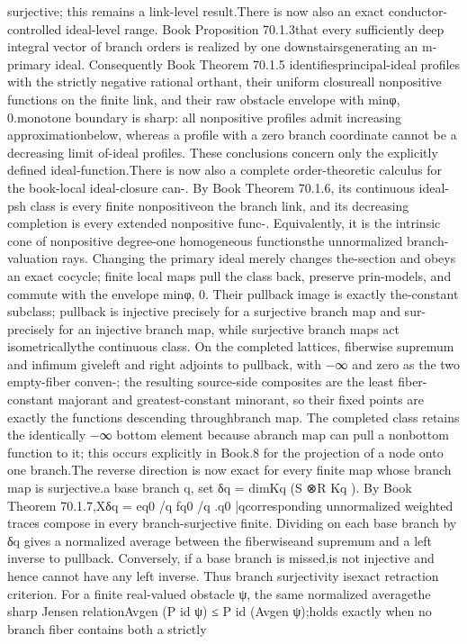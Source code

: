 \documentclass[11pt]{article}
\begin{document}
\begin{GrantData}
{surjective; this remains a link-level result.\n    There is now also an exact conductor-controlled ideal-level range. Book Proposition 70.1.3\nshows that every suﬃciently deep integral vector of branch orders is realized by one downstairs\nnonzerodivisor generating an m-primary ideal. Consequently Book Theorem 70.1.5 identiﬁes\nthe principal-ideal proﬁles with the strictly negative rational orthant, their uniform closure\nwith all nonpositive functions on the ﬁnite link, and their raw obstacle envelope with min{φ, 0}.\nThe monotone boundary is sharp: all nonpositive proﬁles admit increasing approximation\nfrom below, whereas a proﬁle with a zero branch coordinate cannot be a decreasing limit of\nprimary-ideal proﬁles. These conclusions concern only the explicitly deﬁned ideal-function\nfamily.\n    There is now also a complete order-theoretic calculus for the book-local ideal-closure can-\ndidate. By Book Theorem 70.1.6, its continuous ideal-psh class is every ﬁnite nonpositive\nfunction on the branch link, and its decreasing completion is every extended nonpositive func-\ntion. Equivalently, it is the intrinsic cone of nonpositive degree-one homogeneous functions\non the unnormalized branch-valuation rays. Changing the primary ideal merely changes the\ncross-section and obeys an exact cocycle; ﬁnite local maps pull the class back, preserve prin-\ncipal models, and commute with the envelope min{φ, 0}. Their pullback image is exactly the-constant subclass; pullback is injective precisely for a surjective branch map and sur-\njective precisely for an injective branch map, while surjective branch maps act isometrically\non the continuous class. On the completed lattices, ﬁberwise supremum and inﬁmum give\nexplicit left and right adjoints to pullback, with −∞ and zero as the two empty-ﬁber conven-\ntions; the resulting source-side composites are the least ﬁber-constant majorant and greatest-constant minorant, so their ﬁxed points are exactly the functions descending through\n{}\n\nthe branch map. The completed class retains the identically −∞ bottom element because a\nnonsurjective branch map can pull a nonbottom function to it; this occurs explicitly in Book.8 for the projection of a node onto one branch.\n   The reverse direction is now exact for every ﬁnite map whose branch map is surjective.\nFor a base branch q, set δq = dimKq (S ⊗R Kq ). By Book Theorem 70.1.7,\n                                                  X\n                                           δq =           eq0 /q fq0 /q .\n                                                  q0 |q\n\nThe corresponding unnormalized weighted traces compose in every branch-surjective ﬁnite\ntower. Dividing on each base branch by δq gives a normalized average between the ﬁberwise and supremum and a left inverse to pullback. Conversely, if a base branch is missed,\npullback is not injective and hence cannot have any left inverse. Thus branch surjectivity is\nthe exact retraction criterion. For a ﬁnite real-valued obstacle ψ, the same normalized average the sharp Jensen relation\n\n                                    Avgen (P id ψ) ≤ P id (Avgen ψ);\n\nequality holds exactly when no branch ﬁber contains both a strictly }
\end{GrantData}
\end{document}
